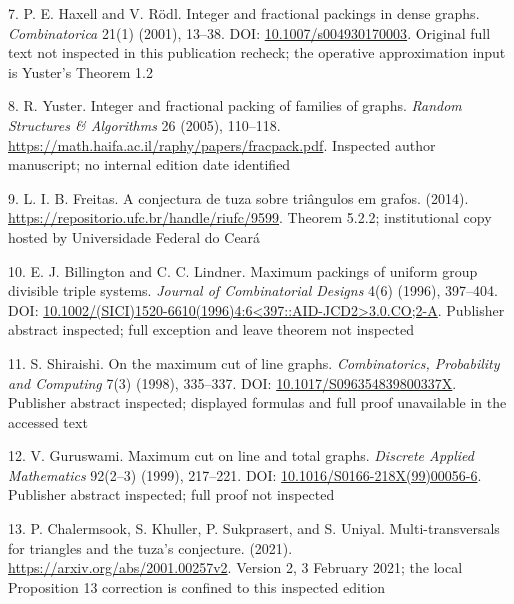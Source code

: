 \documentclass[11pt,a4paper]{article}
\newenvironment{CSLReferences}[2]{\par\setlength{\parindent}{0pt}\setlength{\parskip}{6pt}}{}
\begin{document}
\begin{CSLReferences}{0}{1}
\par{}\label{ref-haxellRodl2001}
7. P. E. Haxell and V. Rödl. Integer and fractional packings in dense graphs. \emph{Combinatorica} 21(1) (2001), 13--38. DOI: \href{https://doi.org/10.1007/s004930170003}{10.1007/s004930170003}. Original full text not inspected in this publication recheck; the operative approximation input is Yuster's Theorem 1.2

\par{}\label{ref-yuster2005}
8. R. Yuster. Integer and fractional packing of families of graphs. \emph{Random Structures \& Algorithms} 26 (2005), 110--118. \url{https://math.haifa.ac.il/raphy/papers/fracpack.pdf}. Inspected author manuscript; no internal edition date identified

\par{}\label{ref-freitas2014}
9. L. I. B. Freitas. A conjectura de tuza sobre triângulos em grafos. (2014). \url{https://repositorio.ufc.br/handle/riufc/9599}. Theorem 5.2.2; institutional copy hosted by Universidade Federal do Ceará

\par{}\label{ref-billingtonLindner1996}
10. E. J. Billington and C. C. Lindner. Maximum packings of uniform group divisible triple systems. \emph{Journal of Combinatorial Designs} 4(6) (1996), 397--404. DOI: \href{https://doi.org/10.1002/(SICI)1520-6610(1996)4:6\%3C397::AID-JCD2\%3E3.0.CO;2-A}{10.1002/(SICI)1520-6610(1996)4:6\textless397::AID-JCD2\textgreater3.0.CO;2-A}. Publisher abstract inspected; full exception and leave theorem not inspected

\par{}\label{ref-shiraishi1998}
11. S. Shiraishi. On the maximum cut of line graphs. \emph{Combinatorics, Probability and Computing} 7(3) (1998), 335--337. DOI: \href{https://doi.org/10.1017/S096354839800337X}{10.1017/S096354839800337X}. Publisher abstract inspected; displayed formulas and full proof unavailable in the accessed text

\par{}\label{ref-guruswami1999}
12. V. Guruswami. Maximum cut on line and total graphs. \emph{Discrete Applied Mathematics} 92(2--3) (1999), 217--221. DOI: \href{https://doi.org/10.1016/S0166-218X(99)00056-6}{10.1016/S0166-218X(99)00056-6}. Publisher abstract inspected; full proof not inspected

\par{}\label{ref-cksu2021v2}
13. P. Chalermsook, S. Khuller, P. Sukprasert, and S. Uniyal. Multi-transversals for triangles and the tuza's conjecture. (2021). \url{https://arxiv.org/abs/2001.00257v2}. Version 2, 3 February 2021; the local Proposition 13 correction is confined to this inspected edition


\end{CSLReferences}
\end{document}
